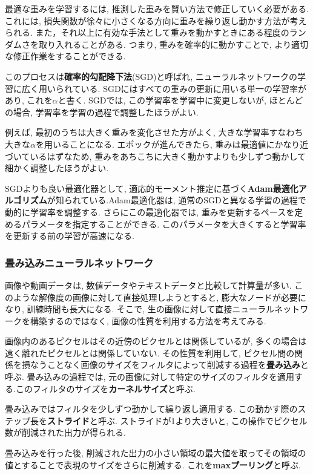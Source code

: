 \documentclass[dvipdfmx]{jsarticle}
\begin{document}
最適な重みを学習するには, 推測した重みを賢い方法で修正していく必要がある.
これには, 損失関数が徐々に小さくなる方向に重みを繰り返し動かす方法が考えられる.
また，それ以上に有効な手法として重みを動かすときにある程度のランダムさを取り入れることがある.
つまり, 重みを確率的に動かすことで, より適切な修正作業をすることができる.

このプロセスは\textbf{確率的勾配降下法}(SGD)と呼ばれ, ニューラルネットワークの学習に広く用いられている.
SGDにはすべての重みの更新に用いる単一の学習率があり, これを$\alpha$と書く.
SGDでは, この学習率を学習中に変更しないが, ほとんどの場合, 学習率を学習の過程で調整したほうがよい.

例えば, 最初のうちは大きく重みを変化させた方がよく, 大きな学習率すなわち大きな$\alpha$を用いることになる.
エポックが進んできたら, 重みは最適値にかなり近づいているはずなため, 重みをあちこちに大きく動かすよりも少しずつ動かして細かく調整したほうがよい.

SGDよりも良い最適化器として, 適応的モーメント推定に基づく\textbf{Adam最適化アルゴリズム}が知られている.Adam最適化器は, 通常のSGDと異なる学習の過程で動的に学習率を調整する.
さらにこの最適化器では, 重みを更新するペースを定めるパラメータを指定することができる.
このパラメータを大きくすると学習率を更新する前の学習が高速になる.


\subsubsection{畳み込みニューラルネットワーク}
画像や動画データは, 数値データやテキストデータと比較して計算量が多い.
このような解像度の画像に対して直接処理しようとすると, 膨大なノードが必要になり, 訓練時間も長大になる.
そこで, 生の画像に対して直接ニューラルネットワークを構築するのではなく, 画像の性質を利用する方法を考えてみる.

画像内のあるピクセルはその近傍のピクセルとは関係しているが, 多くの場合は遠く離れたピクセルとは関係していない.
その性質を利用して, ピクセル間の関係を損なうことなく画像のサイズをフィルタによって削減する過程を\textbf{畳み込み}と呼ぶ.
畳み込みの過程では, 元の画像に対して特定のサイズのフィルタを適用する.このフィルタのサイズを\textbf{カーネルサイズ}と呼ぶ.

畳み込みではフィルタを少しずつ動かして繰り返し適用する.
この動かす際のステップ長を\textbf{ストライド}と呼ぶ.
ストライドが1より大きいと, この操作でピクセル数が削減された出力が得られる.

畳み込みを行った後, 削減された出力の小さい領域の最大値を取ってその領域の値とすることで表現のサイズをさらに削減する.
これを\textbf{maxプーリング}と呼ぶ.
\end{document}
